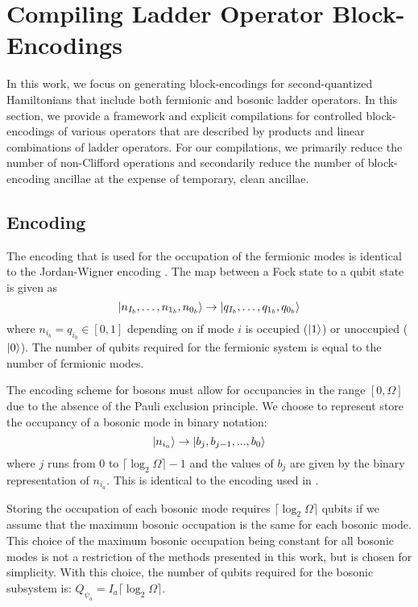 \section{Compiling Ladder Operator Block-Encodings}
\label{sec:ladder-op-oracles}

In this work, we focus on generating block-encodings for second-quantized Hamiltonians that include both fermionic and bosonic ladder operators.
In this section, we provide a framework and explicit compilations for controlled block-encodings of various operators that are described by products and linear combinations of ladder operators.
For our compilations, we primarily reduce the number of non-Clifford operations and secondarily reduce the number of block-encoding ancillae at the expense of temporary, clean ancillae.

\subsection{Encoding}
\label{subsec:encoding}

The encoding that is used for the occupation of the fermionic modes is identical to the Jordan-Wigner encoding \cite{jordan-wigner}.
The map between a Fock state to a qubit state is given as 
\begin{equation}
    \ket{n_{I_b}, \dots, n_{1_b}, n_{0_b}} \rightarrow \ket{q_{I_b}, \dots, q_{1_b}, q_{0_b}}
\end{equation}
where $n_{i_b} = q_{i_b} \in [0, 1]$ depending on if mode $i$ is occupied ($\ket{1}$) or unoccupied ($\ket{0}$).
The number of qubits required for the fermionic system is equal to the number of fermionic modes.

The encoding scheme for bosons must allow for occupancies in the range $[0, \Omega]$ due to the absence of the Pauli exclusion principle.
We choose to represent store the occupancy of a bosonic mode in binary notation: 
\begin{equation}
    \ket{n_{i_a}} \rightarrow \ket{b_j, b_{j-1}, ..., b_0}
\end{equation}
where $j$ runs from $0$ to $\lceil \log_2{\Omega} \rceil - 1$ and the values of $b_j$ are given by the binary representation of $n_{i_a}$.
This is identical to the encoding used in \cite{rhodes2024exponential}. 

Storing the occupation of each bosonic mode requires $\lceil \log_2{\Omega} \rceil$ qubits if we assume that the maximum bosonic occupation is the same for each bosonic mode.
This choice of the maximum bosonic occupation being constant for all bosonic modes is not a restriction of the methods presented in this work, but is chosen for simplicity. 
With this choice, the number of qubits required for the bosonic subsystem is: $Q_{\psi_a} = I_a \lceil \log_2{\Omega} \rceil$.

